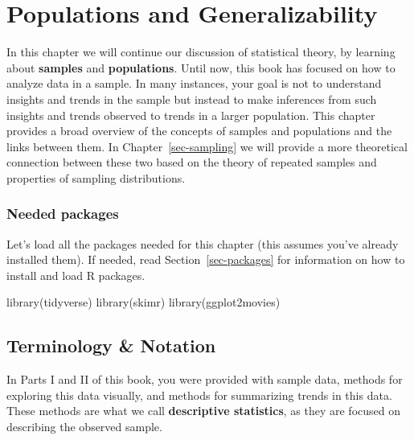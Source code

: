 \documentclass[
  letterpaper,
  DIV=11,
  numbers=noendperiod]{scrreprt}
\newenvironment{Shaded}{\begin{snugshade}}{\end{snugshade}}
\newcommand{\FunctionTok}[1]{\textcolor[rgb]{0.28,0.35,0.67}{#1}}
\newcommand{\NormalTok}[1]{\textcolor[rgb]{0.00,0.23,0.31}{#1}}
\theoremstyle{definition}
\theoremstyle{remark}
\begin{document}
\hypertarget{sec-populations}{%
\chapter{Populations and Generalizability}\label{sec-populations}}

In this chapter we will continue our discussion of statistical theory,
by learning about \textbf{samples} and \textbf{populations}. Until now,
this book has focused on how to analyze data in a sample. In many
instances, your goal is not to understand insights and trends in the
sample but instead to make inferences from such insights and trends
observed to trends in a larger population. This chapter provides a broad
overview of the concepts of samples and populations and the links
between them. In Chapter~\ref{sec-sampling} we will provide a more
theoretical connection between these two based on the theory of repeated
samples and properties of sampling distributions.

\hypertarget{needed-packages-2}{%
\subsection*{Needed packages}\label{needed-packages-2}}

Let's load all the packages needed for this chapter (this assumes you've
already installed them). If needed, read Section~\ref{sec-packages} for
information on how to install and load R packages.

\begin{Shaded}
\begin{Highlighting}[]
\FunctionTok{library}\NormalTok{(tidyverse)}
\FunctionTok{library}\NormalTok{(skimr)}
\FunctionTok{library}\NormalTok{(ggplot2movies)}
\end{Highlighting}
\end{Shaded}

\hypertarget{terminology}{%
\section{Terminology \& Notation}\label{terminology}}

In Parts I and II of this book, you were provided with sample data,
methods for exploring this data visually, and methods for summarizing
trends in this data. These methods are what we call \textbf{descriptive
statistics}, as they are focused on describing the observed sample.
\end{document}
